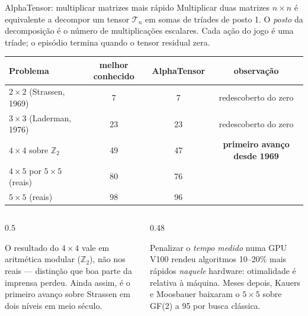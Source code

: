 \documentclass[aspectratio=169, 10pt]{beamer}
\begin{document}
\begin{frame}{AlphaTensor: multiplicar matrizes mais rápido}
  \footnotesize
  Multiplicar duas matrizes $n \times n$ é equivalente a decompor um tensor
  $\mathcal{T}_n$ em somas de tríades de posto 1. O \emph{posto} da decomposição é
  o número de multiplicações escalares. Cada ação do jogo é uma tríade; o
  episódio termina quando o tensor residual zera.

  \medskip
  \centering
  \begin{tabular}{lccc}
    \toprule
    Problema & melhor conhecido & AlphaTensor & observação \\
    \midrule
    $2\times2$ (Strassen, 1969)      & 7  & 7  & redescoberto do zero \\
    $3\times3$ (Laderman, 1976)      & 23 & 23 & redescoberto do zero \\
    $4\times4$ sobre $\mathbb{Z}_2$  & 49 & \alert{47} & \textbf{primeiro avanço desde 1969} \\
    $4\times5$ por $5\times5$ (reais)& 80 & 76 & \\
    $5\times5$ (reais)               & 98 & 96 & \\
    \bottomrule
  \end{tabular}

  \medskip
  \begin{columns}[T]
    \begin{column}{0.5\textwidth}
      \begin{ideiabox}
        O resultado do $4\times4$ vale em aritmética modular ($\mathbb{Z}_2$), não
        nos reais --- distinção que boa parte da imprensa perdeu. Ainda assim, é o
        primeiro avanço sobre Strassen em dois níveis em meio século.
      \end{ideiabox}
    \end{column}
    \begin{column}{0.48\textwidth}
      \begin{alertabox}
        Penalizar o \emph{tempo medido} numa GPU V100 rendeu algoritmos 10--20\%
        mais rápidos \emph{naquele} hardware: otimalidade é relativa à máquina.
        Meses depois, Kauers e Moosbauer baixaram o $5\times5$ sobre GF(2) a 95 por
        busca clássica.
      \end{alertabox}
    \end{column}
  \end{columns}
\end{frame}
\end{document}
